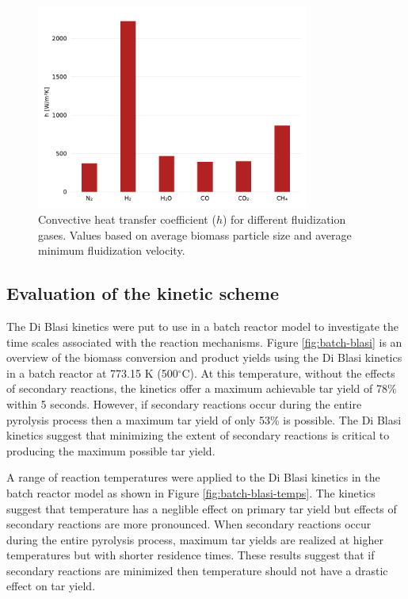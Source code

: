 \begin{figure}[H]
    \centering
    \includegraphics[width=0.8\textwidth]{figures/biomass_hconv.pdf}
    \caption{Convective heat transfer coefficient ($h$) for different fluidization gases. Values based on average biomass particle size and average minimum fluidization velocity.}
    \label{fig:biomass-hconv}
\end{figure}


\subsection{Evaluation of the kinetic scheme}

The Di Blasi kinetics were put to use in a batch reactor model to investigate the time scales associated with the reaction mechanisms. Figure \ref{fig:batch-blasi} is an overview of the biomass conversion and product yields using the Di Blasi kinetics in a batch reactor at 773.15 K (500$^\circ$C). At this temperature, without the effects of secondary reactions, the kinetics offer a maximum achievable tar yield of 78\% within 5 seconds. However, if secondary reactions occur during the entire pyrolysis process then a maximum tar yield of only 53\% is possible. The Di Blasi kinetics suggest that minimizing the extent of secondary reactions is critical to producing the maximum possible tar yield.

A range of reaction temperatures were applied to the Di Blasi kinetics in the batch reactor model as shown in Figure \ref{fig:batch-blasi-temps}. The kinetics suggest that temperature has a neglible effect on primary tar yield but effects of secondary reactions are more pronounced. When secondary reactions occur during the entire pyrolysis process, maximum tar yields are realized at higher temperatures but with shorter residence times. These results suggest that if secondary reactions are minimized then temperature should not have a drastic effect on tar yield.


